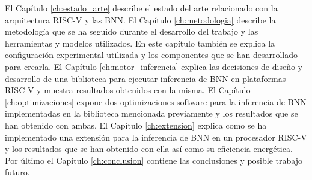 El Capítulo \ref{ch:estado_arte} describe el estado del arte relacionado con la arquitectura RISC-V y las BNN. El Capítulo \ref{ch:metodologia} describe la metodología que se ha seguido durante el desarrollo del trabajo y las herramientas y modelos utilizados. En este capítulo también se explica la configuración experimental utilizada y los componentes que se han desarrollado para crearla. El Capítulo \ref{ch:motor_inferencia} explica las decisiones de diseño y desarrollo de una biblioteca para ejecutar inferencia de BNN en plataformas RISC-V y muestra resultados obtenidos con la misma. El Capítulo \ref{ch:optimizaciones} expone dos optimizaciones software para la inferencia de BNN implementadas en la biblioteca mencionada previamente y los resultados que se han obtenido con ambas. El Capítulo \ref{ch:extension} explica como se ha implementado una extensión para la inferencia de BNN en un procesador RISC-V y los resultados que se han obtenido con ella así como su eficiencia energética. Por último el Capítulo \ref{ch:conclusion} contiene las conclusiones y posible trabajo futuro.
